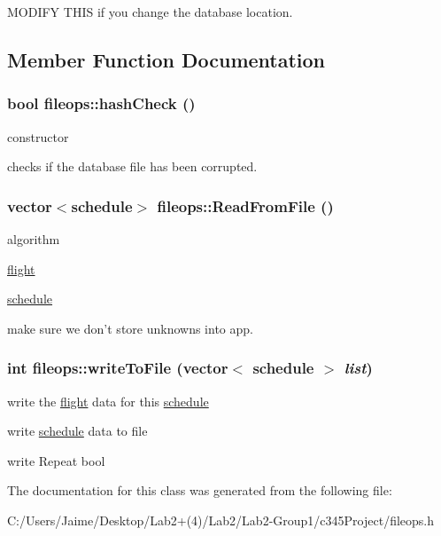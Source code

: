 MODIFY THIS if you change the database location. 

\subsection{Member Function Documentation}
\hypertarget{classfileops_a978fbcad1782aae513c2690bd43985c3}{
\subsubsection[{hashCheck}]{\setlength{\rightskip}{0pt plus 5cm}bool fileops::hashCheck ()}}
\label{classfileops_a978fbcad1782aae513c2690bd43985c3}


constructor 

checks if the database file has been corrupted. \hypertarget{classfileops_ae29d933450817ab66cd743382ce65226}{
\subsubsection[{ReadFromFile}]{\setlength{\rightskip}{0pt plus 5cm}vector$<${\bf schedule}$>$ fileops::ReadFromFile ()}}
\label{classfileops_ae29d933450817ab66cd743382ce65226}


algorithm

\hyperlink{classflight}{flight}

\hyperlink{classschedule}{schedule}

make sure we don't store unknowns into app. \hypertarget{classfileops_a19786cd653a381ba6b185cfbab4efb0a}{
\subsubsection[{writeToFile}]{\setlength{\rightskip}{0pt plus 5cm}int fileops::writeToFile (vector$<$ {\bf schedule} $>$ {\em list})}}
\label{classfileops_a19786cd653a381ba6b185cfbab4efb0a}


write the \hyperlink{classflight}{flight} data for this \hyperlink{classschedule}{schedule}

write \hyperlink{classschedule}{schedule} data to file

write Repeat bool 

The documentation for this class was generated from the following file:\begin{DoxyCompactItemize}
\item 
C:/Users/Jaime/Desktop/Lab2+(4)/Lab2/Lab2-\/Group1/c345Project/fileops.h\end{DoxyCompactItemize}
